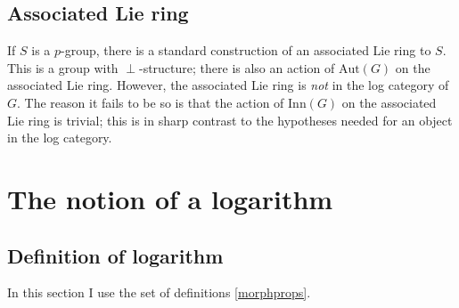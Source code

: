 \documentclass[a4paper]{amsart}
\newcommand{\aut}[1]{\text{Aut}\left(#1\right)}
\newcommand{\inn}[1]{\text{Inn}\left(#1\right)}
\begin{document}
\subsection{Associated Lie ring}

If $S$ is a $p$-group, there is a standard construction of an
associated Lie ring to $S$. This is a group with $\perp$-structure;
there is also an action of $\aut{G}$ on the associated Lie
ring. However, the associated Lie ring is {\em not} in the log
category of $G$. The reason it fails to be so is that the action of
$\inn{G}$ on the associated Lie ring is trivial; this is in sharp
contrast to the hypotheses needed for an object in the log category.

\section{The notion of a logarithm}

\subsection{Definition of logarithm}

In this section I use the set of definitions \ref{morphprops}.
\end{document}
